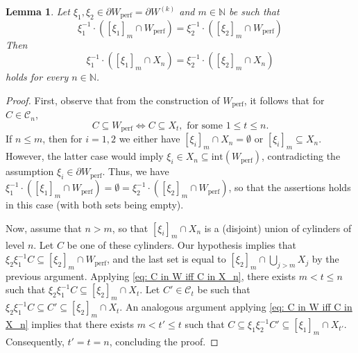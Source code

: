 \documentclass[titlepage,reqno,10pt]{amsart}
\newtheorem{lemma}[theorem]{Lemma}
\theoremstyle{definition}
\newcommand{\tm}{\subseteq}
\begin{document}
\begin{lemma}\label{lemma: nested-union}
Let $\xi_1, \xi_2\in \partial W_{\mathrm{perf}} = \partial W^{(k)}$ and $m\in\mathbb{N}$ be such that 
$$
\xi_1^{-1}\cdot\left([\xi_1]_m\cap W_{\mathrm{perf}} \right)=\xi_2^{-1}\cdot\left([\xi_2]_m\cap W_{\mathrm{perf}} \right)
$$
Then $$\xi_1^{-1}\cdot\left([\xi_1]_m\cap X_n \right)=\xi_2^{-1}\cdot\left([\xi_2]_m\cap X_n \right)$$ holds for every $n\in\mathbb{N}$.
\end{lemma}

\begin{proof}
First, observe that from the construction of $W_{\mathrm{perf}}$, it follows that for $C\in \mathcal{C}_n$,  
\begin{equation}\label{eq: C in W iff C in X_n}
    C\tm W_{\mathrm{perf}} \iff C\tm X_t, \mbox{ for some } 1\leq t\leq n.
\end{equation}
If $n\leq m$, then for $i=1,2$ we either have $[\xi_i]_m \cap X_n = \emptyset$ or $[\xi_i]_m \tm X_n$.
However, the latter case would imply $\xi_i \in X_n \tm \mathrm{int}(W_{\mathrm{perf}})$, contradicting the assumption $\xi_i\in \partial W_{\mathrm{perf}}$. Thus, we have $\xi_1^{-1}\cdot\left([\xi_1]_m\cap W_{\mathrm{perf}} \right)=\emptyset =\xi_2^{-1}\cdot\left([\xi_2]_m\cap W_{\mathrm{perf}} \right)
$, so that the assertions holds in this case (with both sets being empty).

Now, assume that $n> m$, so that $[\xi_i]_m\cap X_n$ is a (disjoint) union of cylinders of level $n$.
Let $C$ be one of these cylinders. 
Our hypothesis implies that $\xi_2\xi_1^{-1} C\subseteq [\xi_2]_m\cap W_{\mathrm{perf}}$, and the last set is  equal to $[\xi_2]_m\cap \bigcup_{j>m} X_j$ by the previous argument.
Applying \eqref{eq: C in W iff C in X_n}, there exists $m< t\leq n$ such that $\xi_2\xi_1^{-1} C\subseteq [\xi_2]_m\cap X_t$.
Let $C'\in \mathcal{C}_t$ be such that $\xi_2\xi_1^{-1} C\subseteq C' \subseteq [\xi_2]_m\cap X_t$.
An analogous argument applying \eqref{eq: C in W iff C in X_n} implies that there exists $m< t'\leq t$ such that $C\subseteq \xi_1\xi_2^{-1} C'\subseteq [\xi_1]_m\cap X_{t'}$.
Consequently, $t'=t=n$, concluding the proof.
\end{proof}
\end{document}
